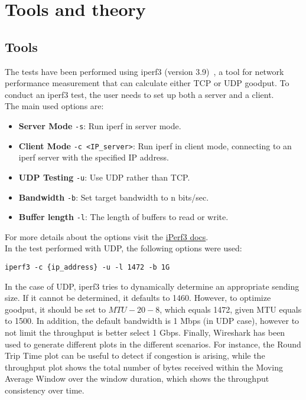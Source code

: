 \section{Tools and theory}
\label{sec:tools_and_theory}

\subsection{Tools}
The tests have been performed using iperf3 (version 3.9)~\cite{iPerf}, a tool for network performance measurement that can calculate either TCP or UDP goodput. To conduct an iperf3 test, the user needs to set up both a server and a client. \\
The main used options are:
\begin{itemize}
    \item \textbf{Server Mode} \texttt{-s}: Run iperf in server mode.
    \item \textbf{Client Mode} \texttt{-c <IP\_server>}: Run iperf in client mode, connecting to an iperf server with the specified IP address.
    \item \textbf{UDP Testing} \texttt{-u}: Use UDP rather than TCP.
    \item \textbf{Bandwidth} \texttt{-b}: Set target bandwidth to n bits/sec.
    \item \textbf{Buffer length} \texttt{-l}: The length of buffers to read or write.
\end{itemize}
For more details about the options visit the \href{www.iperf.fr/iperf-doc.php}{iPerf3 docs}.\\ 
In the test performed with UDP, the following options were used:
\begin{lstlisting}
iperf3 -c {ip_address} -u -l 1472 -b 1G
\end{lstlisting}
In the case of UDP, iperf3 tries to dynamically determine an appropriate sending size. If it cannot be determined, it defaults to 1460. However, to optimize goodput, it should be set to $MTU-20-8$, which equals 1472, given MTU equals to 1500.
In addition, the default bandwidth is 1 Mbps (in UDP case), however to not limit the throughput is better select 1 Gbps.
Finally, Wireshark has been used to generate different plots in the different scenarios. For instance, the Round Trip Time plot can be useful to detect if congestion is arising, while the throughput plot shows the total number of bytes received within the Moving Average Window over the window duration, which shows the throughput consistency over time. 

